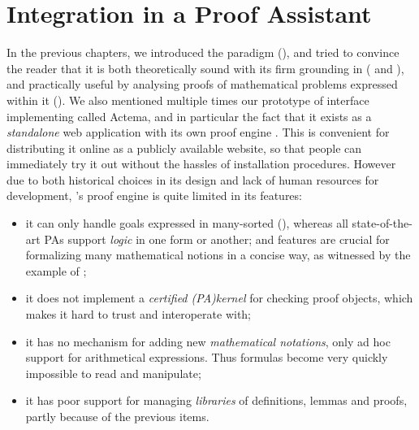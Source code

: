 \setchapterpreamble[u]{\margintoc}
\chapter{Integration in a Proof Assistant}

In the previous chapters, we introduced the  paradigm
(), and tried to convince the reader that it is both theoretically
sound with its firm grounding in   ( and
), and practically useful by analysing proofs of
mathematical problems expressed within it (). We also mentioned
multiple times our prototype of interface implementing  called
Actema, and in particular the fact that it exists as a \emph{standalone} web
application with its own proof engine . This is
convenient for distributing it online as a publicly available website, so that
people can immediately try it out without the hassles of installation
procedures. However due to both historical choices in its design and lack of
human resources for development, 's proof engine is quite limited in its
features:
\begin{itemize}
  \item it can only handle goals expressed in many-sorted 
     (), whereas all state-of-the-art PAs support
    \emph{ logic} in one form or another; and  features
    are crucial for formalizing many mathematical notions in a concise way, as
    witnessed by the example of ;
  \item it does not implement a \emph{certified \kl(PA){kernel}} for checking
    proof objects, which makes it hard to trust and interoperate with;
  \item it has no mechanism for adding new \emph{mathematical notations}, only
    ad hoc support for arithmetical expressions. Thus formulas become very
    quickly impossible to read and manipulate;
  \item it has poor support for managing \emph{libraries} of definitions, lemmas
    and proofs, partly because of the previous items.
\end{itemize}

